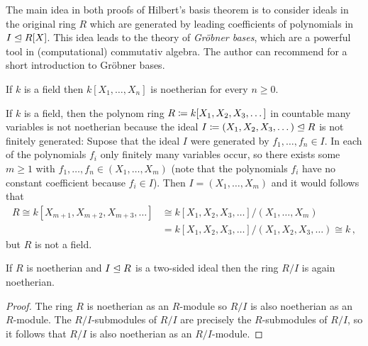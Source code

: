 \begin{remark}
  The main idea in both proofs of Hilbert’s basis theorem is to consider ideals in the original ring $R$ which are generated by leading coefficients of polynomials in $I \trianglelefteq R[X]$.
  This idea leads to the theory of \emph{Gröbner bases}, which are a powerful tool in (computational) commutativ algebra.
  The author can recommend \cite[Section~9.6]{DummitFoote2004} for a short introduction to Gröbner bases.
\end{remark}


\begin{example}
  If $k$ is a field then $k[X_1, \dotsc, X_n]$ is noetherian for every $n \geq 0$.
\end{example}


\begin{example}
  If $k$ is a field, then the polynom ring $R \coloneqq k[X_1, X_2, X_3, \dotsc]$ in countable many variables is not noetherian because the ideal $I \coloneqq (X_1, X_2, X_3, \dotsc) \trianglelefteq R$ is not finitely generated:
  Supose that the ideal $I$ were generated by $f_1, \dotsc, f_n \in I$.
  In each of the polynomials $f_i$ only finitely many variables occur, so there exists some $m \geq 1$ with $f_1, \dotsc, f_n \in (X_1, \dotsc, X_m)$ (note that the polynomials $f_i$ have no constant coefficient because $f_i \in I$).
  Then $I = (X_1, \dotsc, X_m)$ and it would follows that
  \begin{align*}
            R
     \cong  k[X_{m+1}, X_{m+2}, X_{m+3}, \dotsc]
    &\cong  k[X_1, X_2, X_3, \dotsc]/(X_1, \dotsc, X_m)  \\
    &=      k[X_1, X_2, X_3, \dotsc]/(X_1, X_2, X_3, \dotsc)
     \cong  k \,,
  \end{align*}
  but $R$ is not a field.
\end{example}


\begin{lemma}
  \label{lemma: quotient rings are again noetherian}
  If $R$ is noetherian and $I \trianglelefteq R$ is a two-sided ideal then the ring $R/I$ is again noetherian.
\end{lemma}


\begin{proof}
  The ring $R$ is noetherian as an $R$-module so $R/I$ is also noetherian as an $R$-module.
  The $R/I$-submodules of $R/I$ are precisely the $R$-submodules of $R/I$, so it follows that $R/I$ is also noetherian as an $R/I$-module.
\end{proof}


